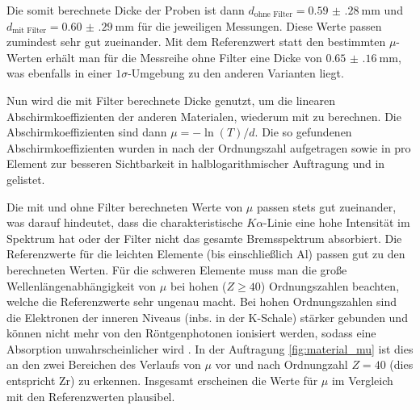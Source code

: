 Die somit berechnete Dicke der Proben ist dann $d_\text{ohne Filter} = \SI{0.59(28)}{\milli\meter}$ und $d_\text{mit Filter} = \SI{0.60(29)}{\milli\meter}$ für die jeweiligen Messungen. Diese Werte passen zumindest sehr gut zueinander. Mit dem Referenzwert statt den bestimmten $\mu$-Werten erhält man für die Messreihe ohne Filter eine Dicke von $\SI{0.65(16)}{\milli\meter}$, was ebenfalls in einer $1\sigma$-Umgebung zu den anderen Varianten liegt.

Nun wird die mit Filter berechnete Dicke genutzt, um die linearen Abschirmkoeffizienten der anderen Materialen, wiederum mit  zu berechnen. Die Abschirmkoeffizienten sind dann $\mu = - \ln(T) / d$. Die so gefundenen Abschirmkoeffizienten wurden in  nach der Ordnungszahl aufgetragen sowie in  pro Element zur besseren Sichtbarkeit in halblogarithmischer Auftragung und in  gelistet.

Die mit und ohne Filter berechneten Werte von $\mu$ passen stets gut zueinander, was darauf hindeutet, dass die charakteristische $K\alpha$-Linie eine hohe Intensität im Spektrum hat oder der Filter nicht das gesamte Bremsspektrum absorbiert. Die Referenzwerte für die leichten Elemente (bis einschließlich Al) passen gut zu den berechneten Werten. Für die schweren Elemente muss man die große Wellenlängenabhängigkeit von $\mu$ bei hohen ($Z\geq40$) Ordnungszahlen beachten, welche die Referenzwerte sehr ungenau macht. Bei hohen Ordnungszahlen sind die Elektronen der inneren Niveaus (inbs. in der K-Schale) stärker gebunden und können nicht mehr von den Röntgenphotonen ionisiert werden, sodass eine Absorption unwahrscheinlicher wird \cite[4]{LDabschwaechung}. In der Auftragung \ref{fig:material_mu} ist dies an den zwei Bereichen des Verlaufs von $\mu$ vor und nach Ordnungzahl $Z=40$ (dies entspricht Zr) zu erkennen. Insgesamt erscheinen die Werte für $\mu$ im Vergleich mit den Referenzwerten plausibel.

